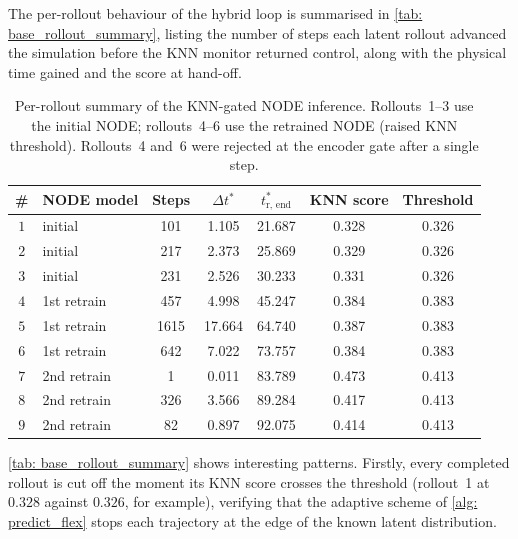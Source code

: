 The per-rollout behaviour of the hybrid loop is summarised in \autoref{tab: base_rollout_summary}, listing the number of steps each latent rollout advanced the simulation before the KNN monitor returned control, along with the physical time gained and the score at hand-off.

\begin{table}[htb]
  \centering
  \begin{tabular}{
    c
    l
    S[table-format=3.0]
    S[table-format=2.3]
    S[table-format=2.3]
    S[table-format=1.3]
    S[table-format=1.3]
  }
    \toprule
    {\#} & NODE model & {Steps} & {$\Delta t^*$} & {$t^*_\text{r, end}$} & {KNN score} & {Threshold} \\
    \midrule
    $1$ & initial     & 101  & 1.105 & 21.687 & 0.328 & 0.326 \\
    $2$ & initial     & 217  & 2.373 & 25.869 & 0.329 & 0.326 \\
    $3$ & initial     & 231  & 2.526 & 30.233 & 0.331 & 0.326  \\
    \hline
    $4$ & 1st retrain & 457  & 4.998 & 45.247 & 0.384 & 0.383 \\
    $5$ & 1st retrain & 1615 & 17.664 & 64.740 & 0.387 & 0.383 \\
    $6$ & 1st retrain & 642  & 7.022 & 73.757 & 0.384 & 0.383 \\
    \hline
    $7$ & 2nd retrain & 1    & 0.011 & 83.789 & 0.473 & 0.413 \\
    $8$ & 2nd retrain & 326  & 3.566 & 89.284 & 0.417 & 0.413 \\
    $9$ & 2nd retrain & 82   & 0.897 & 92.075 & 0.414 & 0.413 \\
    \bottomrule
  \end{tabular}
  \caption{Per-rollout summary of the KNN-gated NODE inference. Rollouts~1--3 use the initial NODE; rollouts~4--6 use the retrained NODE (raised KNN threshold). Rollouts~4 and~6 were rejected at the encoder gate after a single step.}
  \label{tab: base_rollout_summary}
\end{table}

\autoref{tab: base_rollout_summary} shows interesting patterns. Firstly, every completed rollout is cut off the moment its KNN score crosses the threshold (rollout~1 at $0.328$ against $0.326$, for example), verifying that the adaptive scheme of \autoref{alg: predict_flex} stops each trajectory at the edge of the known latent distribution. 


